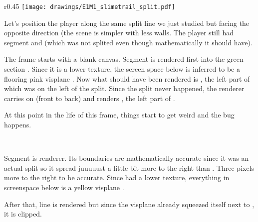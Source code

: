\begin{minipage}{0.47\textwidth}
\end{minipage}
\hspace{4mm}
\begin{minipage}{0.47\textwidth}
\end{minipage} 
\par
\vspace{1mm}
\par



\par
\begin{wrapfigure}[23]{r}{0.45\textwidth}
\centering
\texttt{[image: drawings/E1M1\_slimetrail\_split.pdf]}
\end{wrapfigure}
Let's position the player along the same split line we just studied but facing the opposite direction (the scene is simpler with less walls. The player still had segment  and  (which was not splited even though mathematically it should have).\\
\par
The frame starts with a blank canvas. Segment  is rendered first into the green section . Since it is a lower texture, the screen space below is inferred to be a flooring pink visplane . Now what should have been rendered is , the left part of  which was on the left of the split. Since the split never happened, the renderer carries on (front to back) and renders , the left part of .\\
\par
At this point in the life of this frame, things start to get weird and the bug happens.
 

\\
\par
Segment  is renderer. Its boundaries are mathematically accurate since it was an actual split so it spread juuuuust a little bit more to the right than  . Three pixels more to the right to be accurate. Since  had a lower texture, everything in screenspace below  is a yellow visplane .\\
 \par
 After that, line  is rendered but since the visplane already squeezed itself next to , it is clipped.

